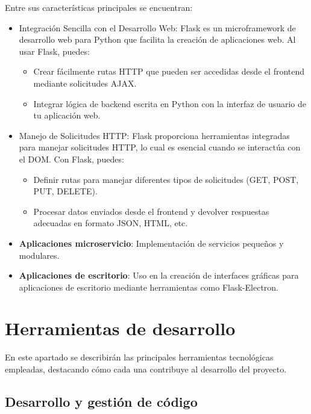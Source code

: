 \documentclass[a4paper, 12pt]{book}
\begin{document}
        Entre sus características principales se encuentran:
\begin{itemize}
    \item{Integración Sencilla con el Desarrollo Web}: Flask es un microframework de desarrollo web para Python que facilita la creación de aplicaciones web. Al usar Flask, puedes:
        \begin{itemize}
            \item Crear fácilmente rutas HTTP que pueden ser accedidas desde el frontend mediante solicitudes AJAX.
            \item Integrar lógica de backend escrita en Python con la interfaz de usuario de tu aplicación web.
        \end{itemize}

    \item{Manejo de Solicitudes HTTP}: Flask proporciona herramientas integradas para manejar solicitudes HTTP, lo cual es esencial cuando se interactúa con el DOM. Con Flask, puedes:
        \begin{itemize}
            \item Definir rutas para manejar diferentes tipos de solicitudes (GET, POST, PUT, DELETE).
            \item Procesar datos enviados desde el frontend y devolver respuestas adecuadas en formato JSON, HTML, etc.
        \end{itemize}

    \item \textbf{Aplicaciones microservicio}: Implementación de servicios pequeños y modulares.
    \item \textbf{Aplicaciones de escritorio}: Uso en la creación de interfaces gráficas para aplicaciones de escritorio mediante herramientas como Flask-Electron.
\end{itemize}
        
\section{Herramientas de desarrollo} 
\label{sec:Herramientas}
En este apartado se describirán las principales herramientas tecnológicas empleadas, destacando cómo cada una contribuye al desarrollo del proyecto.

    \subsection{Desarrollo y gestión de código} 
    
\end{document}
